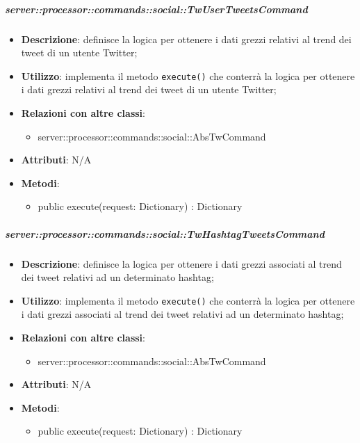         \subparagraph{server::processor::commands::social::TwUserTweetsCommand} %
        \label{subp:bdsm_app_server_processor_commands_social_twcommand}
        \begin{itemize}
          \item \textbf{Descrizione}: definisce la logica per ottenere i dati grezzi relativi al trend dei tweet di un utente Twitter;
          \item \textbf{Utilizzo}: implementa il metodo \texttt{execute()} che conterrà la logica per ottenere i dati grezzi relativi al trend dei tweet di un utente Twitter;
          \item \textbf{Relazioni con altre classi}:
            \begin{itemize}
              \item server::processor::commands::social::AbsTwCommand
            \end{itemize}
			\item \textbf{Attributi}: N/A
			\item \textbf{Metodi}:
        	\begin{itemize}
          		\item public execute(request: Dictionary) : Dictionary
        	\end{itemize}
        \end{itemize}

        \subparagraph{server::processor::commands::social::TwHashtagTweetsCommand} %
        \label{subp:bdsm_app_server_processor_commands_social_twhashtagtweetscommand}
        \begin{itemize}
          \item \textbf{Descrizione}: definisce la logica per ottenere i dati grezzi associati al trend dei tweet relativi ad un determinato hashtag;
          \item \textbf{Utilizzo}: implementa il metodo \texttt{execute()} che conterrà la logica per ottenere i dati grezzi associati al trend dei tweet relativi ad un determinato hashtag;
          \item \textbf{Relazioni con altre classi}:
            \begin{itemize}
              \item server::processor::commands::social::AbsTwCommand
            \end{itemize}
			\item \textbf{Attributi}: N/A
			\item \textbf{Metodi}:
        	\begin{itemize}
          		\item public execute(request: Dictionary) : Dictionary
        	\end{itemize}
        \end{itemize}

